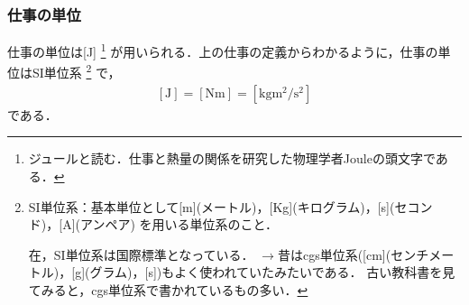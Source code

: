         \subsubsection{仕事の単位}
                仕事の単位は[J]
                    \footnote{
                        ジュールと読む．仕事と熱量の関係を研究した物理学者Jouleの頭文字である．
                    }
                が用いられる．上の仕事の定義からわかるように，仕事の単位はSI単位系
                    \footnote{
                        SI単位系：基本単位として[m](メートル)，[Kg](キログラム)，[s](セコンド)，[A](アンペア)
                        を用いる単位系のこと．\date 現在，SI単位系は国際標準となっている．
                        $\longrightarrow $昔はcgs単位系([cm](センチメートル)，[g](グラム)，[s])もよく使われていたみたいである．
                        古い教科書を見てみると，cgs単位系で書かれているもの多い．
                    }
                で，
                    \begin{align}\label{eq:Jule}
                        \mathrm{
                            [J]=[Nm]=[kgm^{2}/s^{2}]
                        }
                    \end{align}
                である．

